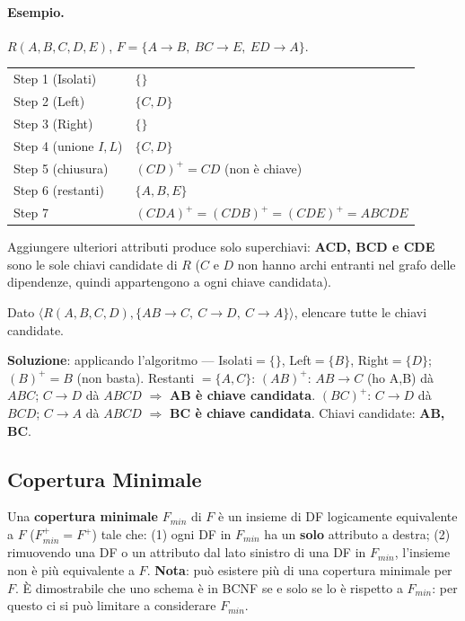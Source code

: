 \documentclass[12pt, a4paper]{article}
\begin{document}
\paragraph{Esempio.} $R(A,B,C,D,E)$, $F=\{A\to B,\ BC \to E,\ ED\to A\}$.
\begin{center}
\begin{tabular}{@{}ll@{}}
\toprule
Step 1 (Isolati) & $\{\}$ \\
Step 2 (Left) & $\{C, D\}$ \\
Step 3 (Right) & $\{\}$ \\
Step 4 (unione $I,L$) & $\{C, D\}$ \\
Step 5 (chiusura) & $(CD)^+ = CD$ (non è chiave) \\
Step 6 (restanti) & $\{A, B, E\}$ \\
Step 7 & $(CDA)^+{=}(CDB)^+{=}(CDE)^+{=}ABCDE$ \\
\bottomrule
\end{tabular}
\end{center}
Aggiungere ulteriori attributi produce solo superchiavi: \textbf{ACD, BCD e CDE} sono le sole chiavi candidate di $R$ ($C$ e $D$ non hanno archi entranti nel grafo delle dipendenze, quindi appartengono a ogni chiave candidata).

\begin{tcolorbox}[colback=lightergray!10, colframe=tocsec, title=\textbf{Esercizio}]
Dato $\langle R(A,B,C,D), \{AB\to C,\ C\to D,\ C\to A\}\rangle$, elencare tutte le chiavi candidate.
\end{tcolorbox}
\textbf{Soluzione}: applicando l'algoritmo — Isolati$=\{\}$, Left$=\{B\}$, Right$=\{D\}$; $(B)^+=B$ (non basta). Restanti $=\{A,C\}$: $(AB)^+$: $AB\to C$ (ho A,B) dà $ABC$; $C\to D$ dà $ABCD$ $\Rightarrow$ \textbf{AB è chiave candidata}. $(BC)^+$: $C\to D$ dà $BCD$; $C\to A$ dà $ABCD$ $\Rightarrow$ \textbf{BC è chiave candidata}. Chiavi candidate: \textbf{AB, BC}.

\subsection{Copertura Minimale}

Una \textbf{copertura minimale} $F_{min}$ di $F$ è un insieme di DF logicamente equivalente a $F$ ($F_{min}^+ = F^+$) tale che: (1) ogni DF in $F_{min}$ ha un \textbf{solo} attributo a destra; (2) rimuovendo una DF o un attributo dal lato sinistro di una DF in $F_{min}$, l'insieme non è più equivalente a $F$. \textbf{Nota}: può esistere più di una copertura minimale per $F$. È dimostrabile che uno schema è in BCNF se e solo se lo è rispetto a $F_{min}$: per questo ci si può limitare a considerare $F_{min}$.
\end{document}
